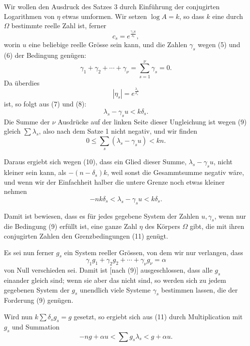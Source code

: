 \documentclass[11pt]{article}
\begin{document}
Wir wollen den Ausdruck des Satzes 3 durch Einführung der conjugirten Logarithmen von $\eta$ etwas umformen. Wir setzen $\log A=k$, so dass $k$ eine durch $\Omega$ bestimmte reelle Zahl ist, ferner
\begin{equation}
c_s=e^{\frac{\gamma_su}{\delta_s}},
\tag{8}
\end{equation}
worin $u$ eine beliebige reelle Grösse sein kann, und die Zahlen $\gamma_s$ wegen (5) und (6) der Bedingung genügen:
\begin{equation}
\gamma_1+\gamma_2+\cdots+\gamma_\nu=\sum_{s=1}^{\nu}\gamma_s=0.
\tag{9}
\end{equation}
Da überdies
\[
|\eta_s|=e^{\frac{\lambda_s}{\delta_s}}
\]
ist, so folgt aus (7) und (8):
\begin{equation}
\lambda_s-\gamma_su<k\delta_s.
\tag{10}
\end{equation}
Die Summe der $\nu$ Ausdrücke auf der linken Seite dieser Ungleichung ist wegen (9) gleich $\sum\lambda_s$, also nach dem Satze 1 nicht negativ, und wir finden
\[
0\leq \sum_s(\lambda_s-\gamma_su)<kn.
\]

Daraus ergiebt sich wegen (10), dass ein Glied dieser Summe, $\lambda_s-\gamma_su$, nicht kleiner sein kann, als $-(n-\delta_s)k$, weil sonst die Gesammtsumme negativ wäre, und wenn wir der Einfachheit halber die untere Grenze noch etwas kleiner nehmen
\begin{equation}
-nk\delta_s<\lambda_s-\gamma_su<k\delta_s.
\tag{11}
\end{equation}

Damit ist bewiesen, dass es für jedes gegebene System der Zahlen $u,\gamma_s$, wenn nur die Bedingung (9) erfüllt ist, eine ganze Zahl $\eta$ des Körpers $\Omega$ gibt, die mit ihren conjugirten Zahlen den Grenzbedingungen (11) genügt.

Es sei nun ferner $g_s$ ein System reeller Grössen, von dem wir nur verlangen, dass
\[
\gamma_1g_1+\gamma_2g_2+\cdots+\gamma_\nu g_\nu=\alpha
\]
von Null verschieden sei. Damit ist [nach (9)] ausgeschlossen, dass alle $g_s$ einander gleich sind; wenn sie aber das nicht sind, so werden sich zu jedem gegebenen System der $g_s$ unendlich viele Systeme $\gamma_s$ bestimmen lassen, die der Forderung (9) genügen.

Wird nun $k\sum\delta_sg_s=g$ gesetzt, so ergiebt sich aus (11) durch Multiplication mit $g_s$ und Summation
\begin{equation}
-ng+\alpha u<\sum g_s\lambda_s<g+\alpha u.
\tag{12}
\end{equation}
\end{document}
